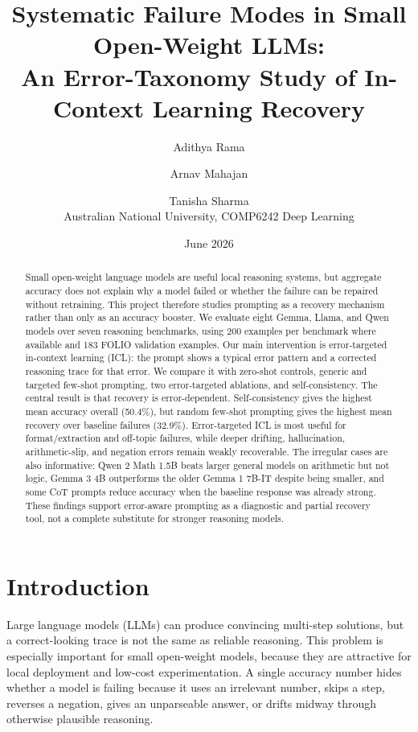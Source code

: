\documentclass[10pt,twocolumn]{article}
\title{\vspace{-1.2em}Systematic Failure Modes in Small Open-Weight LLMs:\\
An Error-Taxonomy Study of In-Context Learning Recovery}
\author{Adithya Rama \and Arnav Mahajan \and Tanisha Sharma\\
Australian National University, COMP6242 Deep Learning}
\date{June 2026}
\begin{document}
\maketitle

\begin{abstract}
Small open-weight language models are useful local reasoning systems, but aggregate accuracy does not explain why a model failed or whether the failure can be repaired without retraining. This project therefore studies prompting as a recovery mechanism rather than only as an accuracy booster. We evaluate eight Gemma, Llama, and Qwen models over seven reasoning benchmarks, using 200 examples per benchmark where available and 183 FOLIO validation examples. Our main intervention is error-targeted in-context learning (ICL): the prompt shows a typical error pattern and a corrected reasoning trace for that error. We compare it with zero-shot controls, generic and targeted few-shot prompting, two error-targeted ablations, and self-consistency. The central result is that recovery is error-dependent. Self-consistency gives the highest mean accuracy overall (50.4\%), but random few-shot prompting gives the highest mean recovery over baseline failures (32.9\%). Error-targeted ICL is most useful for format/extraction and off-topic failures, while deeper drifting, hallucination, arithmetic-slip, and negation errors remain weakly recoverable. The irregular cases are also informative: Qwen 2 Math 1.5B beats larger general models on arithmetic but not logic, Gemma 3 4B outperforms the older Gemma 1 7B-IT despite being smaller, and some CoT prompts reduce accuracy when the baseline response was already strong. These findings support error-aware prompting as a diagnostic and partial recovery tool, not a complete substitute for stronger reasoning models.
\end{abstract}

\section{Introduction}
Large language models (LLMs) can produce convincing multi-step solutions, but a correct-looking trace is not the same as reliable reasoning. This problem is especially important for small open-weight models, because they are attractive for local deployment and low-cost experimentation. A single accuracy number hides whether a model is failing because it uses an irrelevant number, skips a step, reverses a negation, gives an unparseable answer, or drifts midway through otherwise plausible reasoning.
\end{document}

